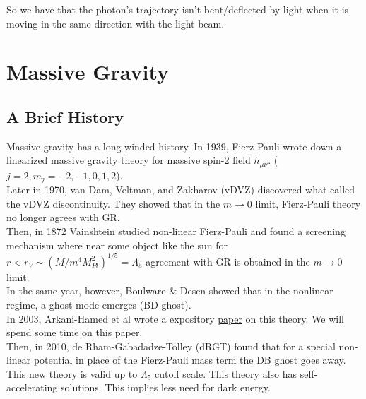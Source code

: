 \documentclass{book}
\theoremstyle{definition}
\begin{document}
So we have that the photon's trajectory isn't bent/deflected by light when it is moving in the same direction with the light beam.









\newpage



\section{Massive Gravity}

\subsection{A Brief History}

Massive gravity has a long-winded history. In 1939, Fierz-Pauli wrote down a linearized massive gravity theory for massive spin-2 field $h_{\mu\nu}$. ($j = 2, m_j = -2,-1,0,1,2$). \\

Later in 1970, van Dam, Veltman, and Zakharov (vDVZ) discovered what called the vDVZ discontinuity. They showed that in the $m\to 0$ limit, Fierz-Pauli theory no longer agrees with GR.\\

Then, in 1872 Vainshtein studied non-linear Fierz-Pauli and found a screening mechanism where near some object like the sun for $r < r_V \sim (M / m^4 M_{Pl}^2)^{1/5} = \Lambda_5$ agreement with GR is obtained in the $m \to 0$ limit. \\

In the same year, however, Boulware \& Desen showed that in the nonlinear regime, a ghost mode emerges (BD ghost).\\

In 2003, Arkani-Hamed et al wrote a expository \href{https://arxiv.org/pdf/hep-th/0210184.pdf}{\underline{paper}} on this theory. We will spend some time on this paper.\\

Then, in 2010, de Rham-Gabadadze-Tolley (dRGT) found that for a special non-linear potential in place of the Fierz-Pauli mass term the DB ghost goes away. This new theory is valid up to $\Lambda_5$ cutoff scale. This theory also has self-accelerating solutions. This implies less need for dark energy.



\newpage
\end{document}
